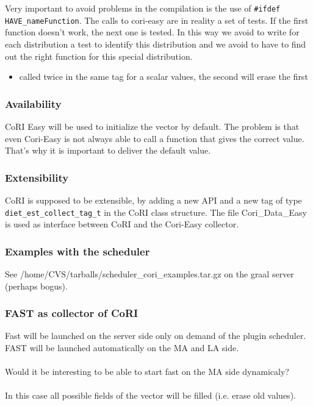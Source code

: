   Very important to avoid problems in the compilation is the use of 
   \texttt{\#ifdef HAVE\_nameFunction}.  
  The calls to cori-easy are in reality a set of tests. If the first function doesn't work,
  the next one is tested. In this way we avoid to write for each 
  distribution a test to identify this distribution and we avoid to 
  have to find out the right function for this special distribution.

  \begin{itemize}
 \item called twice in the same tag for a scalar values, the second will erase the first
  \end{itemize} 

\subsubsection{Availability}
CoRI Easy will be used to initialize the vector by default. The problem is that even Cori-Easy is not always able to call a function that gives the correct value. That's why it is important to deliver the default value.
  \subsubsection{Extensibility}
  CoRI is supposed to be extensible, by adding a new API and a new tag
  of type \texttt{diet\_est\_collect\_tag\_t} in the
  CoRI class structure.
  The file \textsf{Cori\_Data\_Easy} is used as interface between
  CoRI and the Cori-Easy collector.
 \subsubsection{Examples  with the scheduler}
 See /home/CVS/tarballs/scheduler\_cori\_examples.tar.gz  on the graal server (perhaps bogus).
 \subsubsection{FAST as collector of CoRI}
 Fast will be launched on the server side only on demand of the plugin scheduler.
 FAST will be launched automatically on the MA and LA side.\\
 \\ Would it be interesting to be able to start fast on the MA side dynamicaly?\\
\\ 
In this case all possible fields of the vector will be filled (i.e. erase old values).

